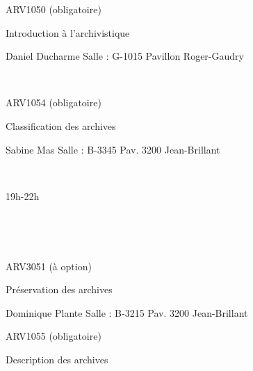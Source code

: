\documentclass [12 pt]{article}
\begin{document}
                                    ARV1050 (obligatoire)
                                
                                
                                    Introduction à l'archivistique
                                
                                Daniel Ducharme
                                Salle : G-1015
                                Pavillon Roger-Gaudry
                            
                             
                            
                                
                                    ARV1054 (obligatoire)
                                
                                
                                    Classification des archives
                                
                                Sabine Mas
                                Salle : B-3345
                                Pav. 3200 Jean-Brillant
                            
                            
                                 
                            
                        
                        
                            19h-22h
                            
                                 
                                 
                            
                             
                            
                                
                                    ARV3051 (à option)
                                
                                
                                    Préservation des archives
                                
                                Dominique Plante
                                Salle : B-3215
                                Pav. 3200 Jean-Brillant
                            
                            
                                
                                    ARV1055 (obligatoire)
                                
                                
                                    Description des archives
                                
\end{document}
